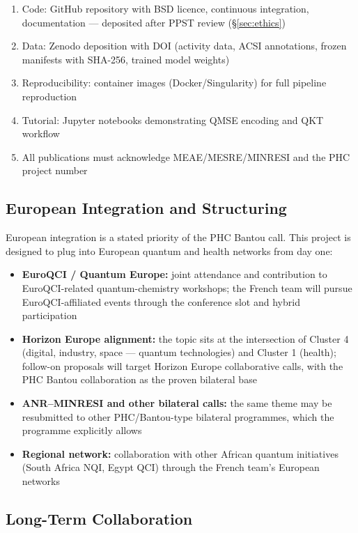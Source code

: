 \documentclass[11pt,a4paper]{article}
\begin{document}
\begin{enumerate}
    \item Code: GitHub repository with BSD licence, continuous integration, documentation --- deposited after PPST review (\S\ref{sec:ethics})
    \item Data: Zenodo deposition with DOI (activity data, ACSI annotations, frozen manifests with SHA-256, trained model weights)
    \item Reproducibility: container images (Docker/Singularity) for full pipeline reproduction
    \item Tutorial: Jupyter notebooks demonstrating QMSE encoding and QKT workflow
    \item All publications must acknowledge MEAE/MESRE/MINRESI and the PHC project number
\end{enumerate}

\subsection{European Integration and Structuring}

European integration is a stated priority of the PHC Bantou call. This project is designed to plug into European quantum and health networks from day one:

\begin{itemize}
    \item \textbf{EuroQCI / Quantum Europe:} joint attendance and contribution to EuroQCI-related quantum-chemistry workshops; the French team will pursue EuroQCI-affiliated events through the conference slot and hybrid participation
    \item \textbf{Horizon Europe alignment:} the topic sits at the intersection of Cluster 4 (digital, industry, space --- quantum technologies) and Cluster 1 (health); follow-on proposals will target Horizon Europe collaborative calls, with the PHC Bantou collaboration as the proven bilateral base
    \item \textbf{ANR--MINRESI and other bilateral calls:} the same theme may be resubmitted to other PHC/Bantou-type bilateral programmes, which the programme explicitly allows
    \item \textbf{Regional network:} collaboration with other African quantum initiatives (South Africa NQI, Egypt QCI) through the French team's European networks
\end{itemize}

\subsection{Long-Term Collaboration}
\end{document}
